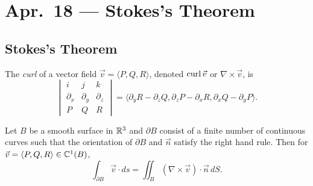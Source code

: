 \chapter{Apr.~18 --- Stokes's Theorem}

\section{Stokes's Theorem}

\begin{definition}
  The \emph{curl} of a vector field $\vec{v} = \langle P, Q, R \rangle$,
  denoted $\operatorname{curl} \vec{v}$ or $\nabla \times \vec{v}$, is
  \[
    \begin{vmatrix}
      i & j & k \\
      \partial_x & \partial_y & \partial_z \\
      P & Q & R
    \end{vmatrix}
    = \langle \partial_y R - \partial_z Q, \partial_z P - \partial_x R, \partial_x Q - \partial_y P \rangle.
  \]
\end{definition}

\begin{theorem}
  Let $B$ be a smooth surface in $\mathbb{R}^3$ and
  $\partial B$ consist of a finite number of continuous
  curves such that the orientation of $\partial B$
  and $\vec{n}$ satisfy the right hand rule.
  Then for $\vec{v} = \langle P, Q, R \rangle \in \mathbb{C}^1(B)$,
  \[
    \int_{\partial B} \vec{v} \cdot ds
    = \iint_B (\nabla \times \vec{v}) \cdot \vec{n} \, dS.
  \]
\end{theorem}

